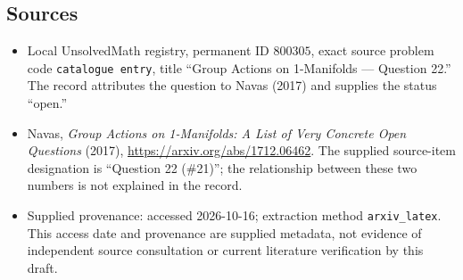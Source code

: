\documentclass[11pt]{article}
\begin{document}
\subsection{Sources}
\begin{itemize}
\item Local UnsolvedMath registry, permanent ID \(800305\), exact source problem code \texttt{catalogue entry}, title ``Group Actions on 1-Manifolds --- Question 22.'' The record attributes the question to Navas (2017) and supplies the status ``open.''
\item Navas, \emph{Group Actions on 1-Manifolds: A List of Very Concrete Open Questions} (2017), \url{https://arxiv.org/abs/1712.06462}. The supplied source-item designation is ``Question 22 (\#21)''; the relationship between these two numbers is not explained in the record.
\item Supplied provenance: accessed 2026-10-16; extraction method \texttt{arxiv\_latex}. This access date and provenance are supplied metadata, not evidence of independent source consultation or current literature verification by this draft.
\end{itemize}
\end{document}
